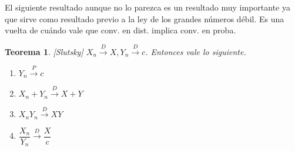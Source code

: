 \documentclass[11pt]{article}
\theoremstyle{plain} %
\newtheorem{teorema}{\color{rojo}Teorema}
\theoremstyle{definition}
\theoremstyle{remark}
\newcommand{\proba}{\overset{P}{\to}}
\newcommand{\dist}{\overset{D}{\to}}
\begin{document}
\medskip

El siguiente resultado aunque no lo parezca es un resultado muy importante ya que sirve como resultado previo a la ley de los grandes números débil. Es una vuelta de cuándo vale que conv. en dist. implica conv. en proba.
\begin{teorema}
	\label{teo:slutsky}
	[Slutsky]
	$X_n \dist X , Y_n \dist c$. Entonces vale lo siguiente.
	\begin{enumerate}
		\item $Y_n \proba c$
		\item $X_n + Y_n \dist X + Y$
		\item $X_{n}Y_{n} \dist XY$ 
		\item $\dfrac{X_{n}}{Y_n} \dist \dfrac{X}{c}$
	\end{enumerate}
\end{teorema}
\end{document}
